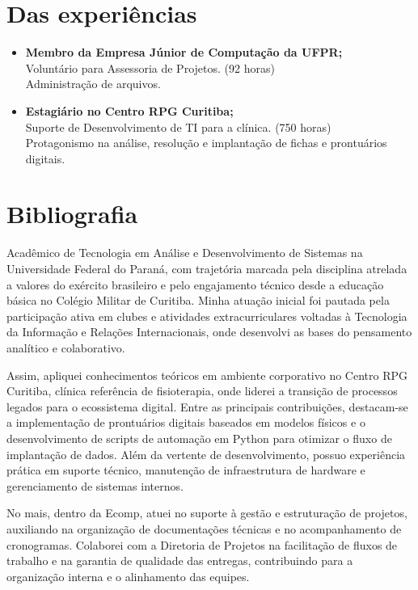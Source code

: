 \documentclass[a4paper,11pt]{article}
\begin{document}
\section*{Das experiências}
\begin{itemize}[noitemsep, label={$\bullet$}]
    \item \textbf{Membro da Empresa Júnior de Computação da UFPR;}\\
    Voluntário para Assessoria de Projetos. (92 horas)\\
    Administração de arquivos.
    
    \vspace{0.2cm}
    \item \textbf{Estagiário no Centro RPG Curitiba;}\\
    Suporte de Desenvolvimento de TI para a clínica. (750 horas)\\
    Protagonismo na análise, resolução e implantação de fichas e prontuários digitais.
\end{itemize}

\section*{Bibliografia}
Acadêmico de Tecnologia em Análise e Desenvolvimento de Sistemas na Universidade Federal do Paraná, com trajetória marcada pela disciplina atrelada a valores do exército brasileiro e pelo engajamento técnico desde a educação básica no Colégio Militar de Curitiba. Minha atuação inicial foi pautada pela participação ativa em clubes e atividades extracurriculares voltadas à Tecnologia da Informação e Relações Internacionais, onde desenvolvi as bases do pensamento analítico e colaborativo.

Assim, apliquei conhecimentos teóricos em ambiente corporativo no Centro RPG Curitiba, clínica referência de fisioterapia, onde liderei a transição de processos legados para o ecossistema digital. Entre as principais contribuições, destacam-se a implementação de prontuários digitais baseados em modelos físicos e o desenvolvimento de scripts de automação em Python para otimizar o fluxo de implantação de dados. Além da vertente de desenvolvimento, possuo experiência prática em suporte técnico, manutenção de infraestrutura de hardware e gerenciamento de sistemas internos.

No mais, dentro da Ecomp, atuei no suporte à gestão e estruturação de projetos, auxiliando na organização de documentações técnicas e no acompanhamento de cronogramas. Colaborei com a Diretoria de Projetos na facilitação de fluxos de trabalho e na garantia de qualidade das entregas, contribuindo para a organização interna e o alinhamento das equipes.
\end{document}
